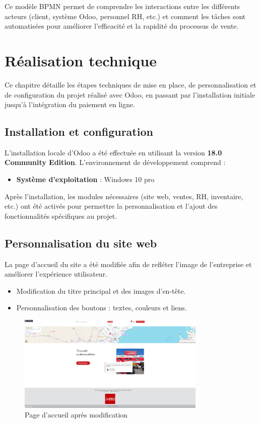 \documentclass[12pt]{report}
\begin{document}
Ce modèle BPMN permet de comprendre les interactions entre les différents acteurs (client, système Odoo, personnel RH, etc.) et comment les tâches sont automatisées pour améliorer l'efficacité et la rapidité du processus de vente.

\chapter{Réalisation technique}

Ce chapitre détaille les étapes techniques de mise en place, de personnalisation et de configuration du projet réalisé avec Odoo, en passant par l'installation initiale jusqu’à l’intégration du paiement en ligne.

\section{Installation et configuration}

L'installation locale d'Odoo a été effectuée en utilisant la version \textbf{18.0 Community Edition}. L'environnement de développement comprend :

\begin{itemize}
\item \textbf{Système d’exploitation} : Windows 10 pro
\end{itemize}

Après l'installation, les modules nécessaires (site web, ventes, RH, inventaire, etc.) ont été activés pour permettre la personnalisation et l’ajout des fonctionnalités spécifiques au projet.

\section{Personnalisation du site web}

La page d’accueil du site a été modifiée afin de refléter l’image de l’entreprise et améliorer l’expérience utilisateur.

\begin{itemize}
\item Modification du titre principal et des images d’en-tête.
\item Personnalisation des boutons : textes, couleurs et liens.
\end{itemize}

\begin{figure}[H]
\centering
\includegraphics[width=0.8\textwidth]{images/interfaces/page_acceuil.PNG}
\caption{Page d'accueil après modification}
\end{figure}
\end{document}
